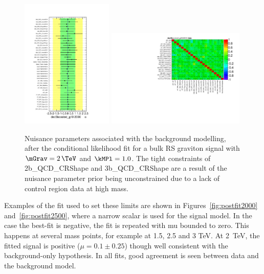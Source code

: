 \begin{figure}[htbp!]
\begin{center}
\includegraphics[width=0.39\textwidth,angle=-90]{figures/boosted/results/pulls_2000_data.pdf}
\includegraphics[width=0.59\textwidth,angle=-90]{figures/boosted/results/corr_2000_data.pdf}
\caption{Nuisance parameters associated with the background modelling, after the conditional likelihood fit for a bulk RS graviton signal with $\mGrav=2\,\TeV$ and $\kMPl=1.0$. The tight constraints of 2b\_QCD\_CRShape and 3b\_QCD\_CRShape are a result of the nuisance parameter prior being unconstrained due to a lack of control region data at high mass.}
\label{fig:nuisanceParams}
\end{center}
\end{figure}

Examples of the fit used to set these limits are shown in Figures~\ref{fig:postfit2000} and~\ref{fig:postfit2500}, where a narrow scalar is used for the signal model. In the case the best-fit is negative, the fit is repeated with mu bounded to zero. This happens at several mass points, for example at 1.5, 2.5 and 3 TeV. At 2~TeV, the fitted signal is positive ($\mu=0.1\pm0.25$) though well consistent with the background-only hypothesis. In all fits, good agreement is seen between data and the background model.

